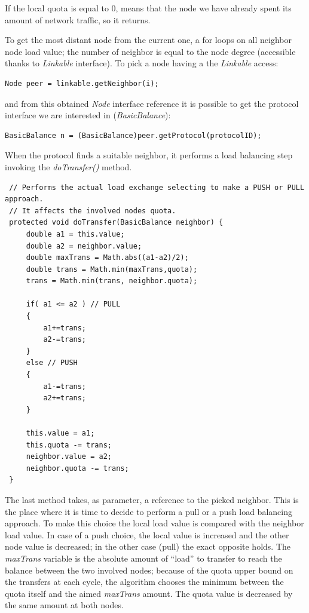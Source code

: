 \documentclass[a4paper,11pt]{article}
\begin{document}
If the local quota is equal to 0, means that the node we have already
spent its amount of network traffic, so it returns.

To get the most distant node from the current one, a for loops on
all neighbor node load value; the number of neighbor is equal to the
node degree (accessible thanks to \emph{Linkable} interface). To pick
a node having a the \emph{Linkable} access:

\begin{verbatim}
Node peer = linkable.getNeighbor(i);
\end{verbatim}

and from this obtained \emph{Node} interface reference it is possible
to get the protocol interface we are interested in (\emph{BasicBalance}):

\begin{verbatim}
BasicBalance n = (BasicBalance)peer.getProtocol(protocolID);
\end{verbatim}

When the protocol finds a suitable neighbor, it performs a load balancing
step invoking the \emph{doTransfer()} method.

\footnotesize
\begin{verbatim}
 // Performs the actual load exchange selecting to make a PUSH or PULL approach.
 // It affects the involved nodes quota. 
 protected void doTransfer(BasicBalance neighbor) {
     double a1 = this.value;
     double a2 = neighbor.value;
     double maxTrans = Math.abs((a1-a2)/2);
     double trans = Math.min(maxTrans,quota);
     trans = Math.min(trans, neighbor.quota);
 
     if( a1 <= a2 ) // PULL
     {
         a1+=trans;
         a2-=trans;
     }
     else // PUSH
     {
         a1-=trans;
         a2+=trans;
     }
     
     this.value = a1;
     this.quota -= trans;
     neighbor.value = a2;
     neighbor.quota -= trans; 
 }
\end{verbatim}
\normalsize


The last method takes, as parameter, a reference to the picked neighbor.
This is the place where it is time to decide to perform a pull or a
push load balancing approach. To make this choice the local load value
is compared with the neighbor load value. In case of a push choice,
the local value is increased and the other node value is decreased;
in the other case (pull) the exact opposite holds. The \emph{maxTrans}
variable is the absolute amount of ``{}load'' to transfer
to reach the balance between the two involved nodes; because of the
quota upper bound on the transfers at each cycle, the algorithm chooses
the minimum between the quota itself and the aimed \emph{maxTrans}
amount. The quota value is decreased by the same amount at both nodes.
\end{document}
